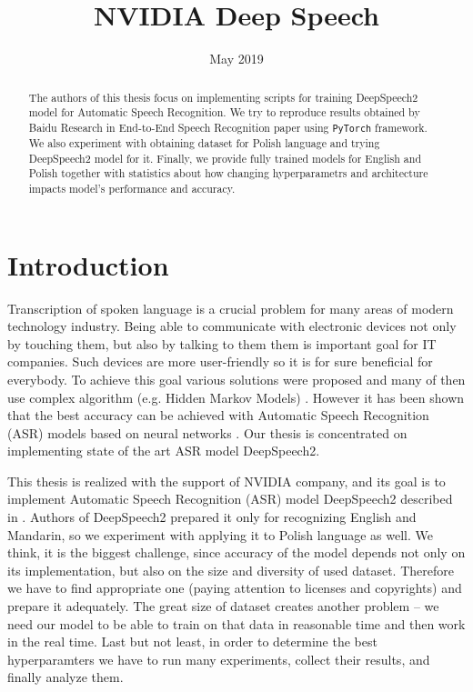 \documentclass[licencjacka,en]{pracamgr}
\title{NVIDIA Deep Speech}
\date{May 2019}
\begin{document}
\maketitle

\begin{abstract}
  The authors of this thesis focus on implementing scripts for training DeepSpeech2 model for Automatic Speech Recognition. We try to reproduce results obtained by Baidu Research in End-to-End Speech Recognition paper \cite{DS2} using \texttt{PyTorch} framework. We also experiment with obtaining dataset for Polish language and trying DeepSpeech2 model for it. Finally, we provide fully trained models for English and Polish together with statistics about how changing hyperparametrs and architecture impacts model's performance and accuracy.
\end{abstract}

\tableofcontents

\chapter*{Introduction}
Transcription of spoken language is a crucial problem for many areas of modern technology industry. Being able to communicate with electronic devices not only by touching them, but also by talking to them them is important goal for IT companies. Such devices are more user-friendly so it is for sure beneficial for everybody. To achieve this goal various solutions were proposed and many of then use complex algorithm (e.g. Hidden Markov Models) \cite{DS1}. However it has been shown that the best accuracy can be achieved with Automatic Speech Recognition (ASR) models based on neural networks \cite{DS2}. Our thesis is concentrated on implementing state of the art ASR model DeepSpeech2.

This thesis is realized with the support of NVIDIA company, and its goal is to implement Automatic Speech Recognition (ASR) model DeepSpeech2 described in \cite{DS2}. Authors of DeepSpeech2 prepared it only for recognizing English and Mandarin, so we experiment with applying it to Polish language as well. We think, it is the biggest challenge, since accuracy of the model depends not only on its implementation, but also on the size and diversity of used dataset. Therefore we have to find appropriate one (paying attention to licenses and copyrights) and prepare it adequately. The great size of dataset creates another problem -- we need our model to be able to train on that data in reasonable time and then work in the real time. Last but not least, in order to determine the best hyperparamters we have to run many experiments, collect their results, and finally analyze them.
\end{document}
